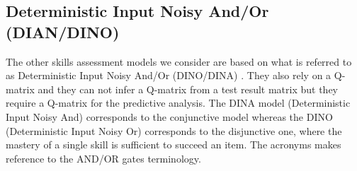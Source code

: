 



\subsection{Deterministic Input Noisy And/Or (DIAN/DINO)}

The other skills assessment models we consider are based on what is referred to as Deterministic Input Noisy And/Or (DINO/DINA) \cite{junker2001cognitive}.  They also rely on a Q-matrix and they can not infer a Q-matrix from a test result matrix but they require a Q-matrix for the predictive analysis. The DINA model (Deterministic Input Noisy And) corresponds to the conjunctive model whereas the DINO (Deterministic Input Noisy Or) corresponds to the disjunctive one, where the mastery of a single skill is sufficient to succeed an item.  The acronyms makes reference to the AND/OR gates terminology.

